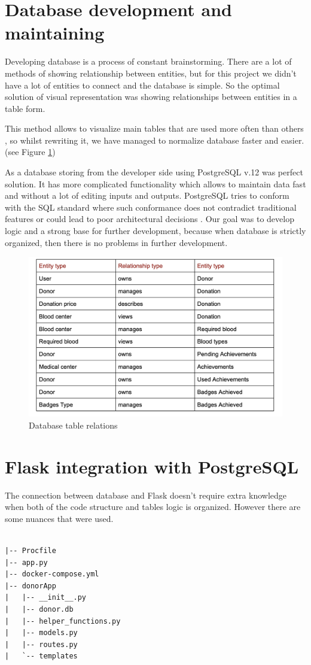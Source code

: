 \section{Database development and maintaining}
Developing database is a process of constant brainstorming. There are a lot of methods of showing relationship between entities, but for this project we didn't have a lot of entities to connect and the database is simple. So the optimal solution of visual representation was showing relationships between entities in a table form.
\par
This method allows to visualize main tables that are used more often than others \cite{adrianne}, so whilst rewriting it, we have managed to normalize database faster and easier.
(see Figure \ref{fig:relations})
\par
As a database storing from the developer side using PostgreSQL v.12 was perfect solution. It has more complicated functionality which allows to maintain data fast and without a lot of editing inputs and outputs. PostgreSQL tries to conform with the SQL standard where such conformance does not contradict traditional features or could lead to poor architectural decisions \cite{postgresql}. Our goal was to develop logic and a strong base for further development, because when database is strictly organized, then there is no problems in further development.

\begin{figure}[h]
    \centering
    \includegraphics[scale=0.4]{figures/relations.png}
    \caption{Database table relations}
    \label{fig:relations}
\end{figure}

\section{Flask integration with PostgreSQL}
The connection between database and Flask doesn't require extra knowledge when both of the code structure and tables logic is organized. However there are some nuances that were used.
\par
\begin{lstlisting}

|-- Procfile
|-- app.py
|-- docker-compose.yml
|-- donorApp
|   |-- __init__.py
|   |-- donor.db
|   |-- helper_functions.py
|   |-- models.py
|   |-- routes.py
|   `-- templates

\end{lstlisting}

